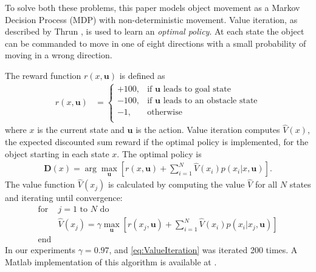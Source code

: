 To solve both these problems, this paper models object movement as a Markov Decision Process (MDP) with non-deterministic movement.  
  Value iteration,  as described by Thrun \cite{Thrun2005}, is used to learn an \emph{optimal policy}.
   At each state the object can be commanded to move in one of eight directions with a small probability of moving in a wrong direction. 
 
The reward function $r(x,\mathbf{u})$ is defined as
\begin{align}
r(x,\mathbf{u}) &=  \left\{
\begin{array}{ll}
     +100, &  \textrm{if } \mathbf{u} \textrm{ leads to goal state}\\
      -100, & \textrm{if } \mathbf{u} \textrm{ leads to an obstacle state} \\
      -1, & \textrm{otherwise}\\
\end{array} 
\right.
\end{align}
 where $x$ is the current state and $\mathbf{u}$ is the action.   %
  Value iteration computes $\hat{V}(x)$, the expected discounted sum reward if the optimal policy is implemented, for the object starting in each state $x$. The optimal policy is %
   \begin{align} \mathbf{D}(x) = \arg\max_{\mathbf{u}}   [ r(x,\mathbf{u}) + \sum\limits_{i=1}^N \hat{V}(x_i) p(x_i|x, \mathbf{u})].  \label{eq:OptimalPolicy}
   \end{align}
   The value function $\hat{V}(x_j) $ is calculated by computing the value $\hat{V}$ for all $N$ states and iterating until convergence:
\begin{align}
\text{for }&\text{$j=1$ to $N$ do} \nonumber \\
&\hat{V} (x_j) = \gamma \max_{\mathbf{u}} [r(x_j,\mathbf{u}) + \sum\limits_{i=1}^N \hat{V}(x_i) p(x_i| x_j,\mathbf{u})] \label{eq:ValueIteration} \nonumber\\
\text{end}& 
\end{align}
In our experiments $\gamma = 0.97$, and \eqref{eq:ValueIteration} was iterated 200 times. A {\sc Matlab} implementation of this algorithm is available at \cite{Becker2015MDP}.

